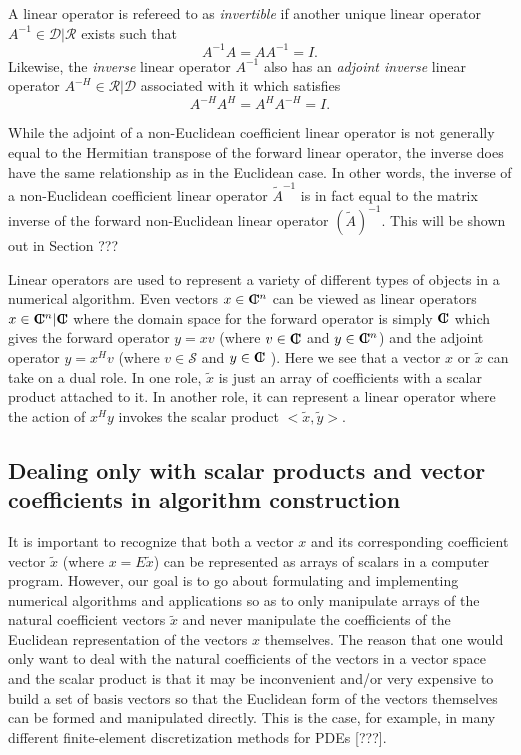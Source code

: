 \documentclass[pdf,ps2pdf,11pt]{SANDreport}
\begin{document}
A linear operator is refereed to as {}\textit{invertible} if another unique
linear operator $A^{-1}\in\mathcal{D}|\mathcal{R}$ exists such that
%
\[
A^{-1} A = A A^{-1} = I.
\]
%
Likewise, the {}\textit{inverse} linear operator $A^{-1}$ also has an
{}\textit{adjoint inverse} linear operator $A^{-H}\in\mathcal{R}|\mathcal{D}$
associated with it which satisfies
%
\[
A^{-H} A^H = A^H A^{-H} = I.
\]
%

While the adjoint of a non-Euclidean coefficient linear operator is not
generally equal to the Hermitian transpose of the forward linear operator, the
inverse does have the same relationship as in the Euclidean case.  In other
words, the inverse of a non-Euclidean coefficient linear operator
$\tilde{A}^{-1}$ is in fact equal to the matrix inverse of the forward
non-Euclidean linear operator $(\tilde{A})^{-1}$.  This will be shown out in
Section ???

Linear operators are used to represent a variety of different types of objects
in a numerical algorithm.  Even vectors $x\in\mbox{\textbf{C}}\hspace{-1.1ex}\mbox{l}\hspace{0.4ex}^n$ can be viewed as
linear operators $x\in\mbox{\textbf{C}}\hspace{-1.1ex}\mbox{l}\hspace{0.4ex}^n|\mbox{\textbf{C}}\hspace{-1.1ex}\mbox{l}\hspace{0.4ex}$ where the domain space for the forward
operator is simply $\mbox{\textbf{C}}\hspace{-1.1ex}\mbox{l}\hspace{0.4ex}$ which gives the forward operator $y = x v$ (where
$v\in\mbox{\textbf{C}}\hspace{-1.1ex}\mbox{l}\hspace{0.4ex}$ and $y\in\mbox{\textbf{C}}\hspace{-1.1ex}\mbox{l}\hspace{0.4ex}^n$) and the adjoint operator $y = x^H v$ (where
$v\in\mathcal{S}$ and $y\in\mbox{\textbf{C}}\hspace{-1.1ex}\mbox{l}\hspace{0.4ex}$ ).  Here we see that a vector $x$ or
$\tilde{x}$ can take on a dual role.  In one role, $\tilde{x}$ is just an
array of coefficients with a scalar product attached to it.  In another role,
it can represent a linear operator where the action of $x^H y$ invokes the
scalar product $<\tilde{x},\tilde{y}>$.

\subsection{Dealing only with scalar products and vector coefficients in algorithm construction}

It is important to recognize that both a vector $x$ and its corresponding
coefficient vector $\tilde{x}$ (where $x = E\tilde{x}$) can be represented as
arrays of scalars in a computer program.  However, our goal is to go about
formulating and implementing numerical algorithms and applications so as to
only manipulate arrays of the natural coefficient vectors $\tilde{x}$ and
never manipulate the coefficients of the Euclidean representation of the
vectors $x$ themselves.  The reason that one would only want to deal with the
natural coefficients of the vectors in a vector space and the scalar product
is that it may be inconvenient and/or very expensive to build a set of basis
vectors so that the Euclidean form of the vectors themselves can be formed and
manipulated directly.  This is the case, for example, in many different
finite-element discretization methods for PDEs [???].
\end{document}

